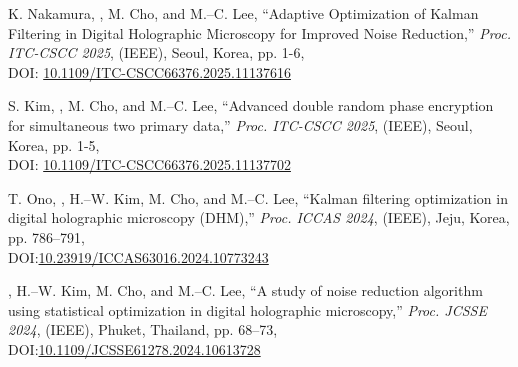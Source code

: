\documentclass[a4paper,9pt]{extarticle}
\begin{document}
\begin{enumerate}[label={[\arabic*]}, start=1]
    \item 
    K. Nakamura, , M. Cho, and M.--C. Lee, 
    ``Adaptive Optimization of Kalman Filtering in Digital Holographic Microscopy for Improved Noise Reduction,'' 
    \textit{Proc. ITC-CSCC 2025}, (IEEE),
    Seoul, Korea, 
    pp. 1-6, \\
    DOI: \href{https://doi.org/10.1109/ITC-CSCC66376.2025.11137616}{10.1109/ITC-CSCC66376.2025.11137616}
    
    \item 
    S. Kim, , M. Cho, and M.--C. Lee, 
    ``Advanced double random phase encryption for simultaneous two primary data,'' 
    \textit{Proc. ITC-CSCC 2025}, (IEEE),
    Seoul, Korea,
    pp. 1-5, \\
    DOI: \href{https://doi.org/10.1109/ITC-CSCC66376.2025.11137702}{10.1109/ITC-CSCC66376.2025.11137702}
    
    \item 
    T. Ono, , H.--W. Kim, M. Cho, and M.--C. Lee, 
    ``Kalman filtering optimization in digital holographic microscopy (DHM),'' 
    \textit{Proc. ICCAS 2024}, (IEEE),
    Jeju, Korea, pp. 786--791, \\
    DOI:\href{https://doi.org/10.23919/ICCAS63016.2024.10773243}{10.23919/ICCAS63016.2024.10773243} 
    
    \item 
    , H.--W. Kim, M. Cho, and M.--C. Lee, 
    ``A study of noise reduction algorithm using statistical optimization in digital holographic microscopy,'' 
    \textit{Proc. JCSSE 2024}, (IEEE),
    Phuket, Thailand, pp. 68--73, \\
    DOI:\href{https://doi.org/10.1109/JCSSE61278.2024.10613728}{10.1109/JCSSE61278.2024.10613728} \\
    
    
\end{enumerate} 
\end{document}
